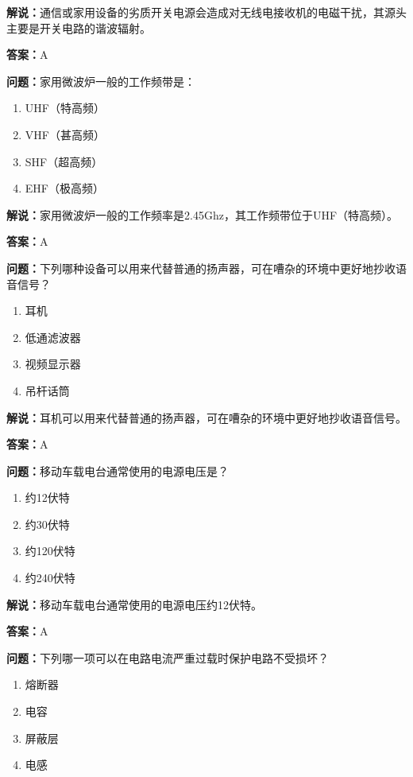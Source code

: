 \textbf{解说：}通信或家用设备的劣质开关电源会造成对无线电接收机的电磁干扰，其源头主要是开关电路的谐波辐射。%

\textbf{答案：}A

\textbf{问题：}家用微波炉一般的工作频带是：

\begin{enumerate}[label=\Alph*), leftmargin=3em]
	\item UHF（特高频）
	\item VHF（甚高频）
	\item SHF（超高频）
	\item EHF（极高频）
\end{enumerate}

\textbf{解说：}家用微波炉一般的工作频率是2.45Ghz，其工作频带位于UHF（特高频）。%

\textbf{答案：}A

\textbf{问题：}下列哪种设备可以用来代替普通的扬声器，可在嘈杂的环境中更好地抄收语音信号？

\begin{enumerate}[label=\Alph*), leftmargin=3em]
	\item 耳机
	\item 低通滤波器
	\item 视频显示器
	\item 吊杆话筒
\end{enumerate}

\textbf{解说：}耳机可以用来代替普通的扬声器，可在嘈杂的环境中更好地抄收语音信号。%

\textbf{答案：}A

\textbf{问题：}移动车载电台通常使用的电源电压是？

\begin{enumerate}[label=\Alph*), leftmargin=3em]
	\item 约12伏特
	\item 约30伏特
	\item 约120伏特
	\item 约240伏特
\end{enumerate}

\textbf{解说：}移动车载电台通常使用的电源电压约12伏特。%

\textbf{答案：}A

\textbf{问题：}下列哪一项可以在电路电流严重过载时保护电路不受损坏？

\begin{enumerate}[label=\Alph*), leftmargin=3em]
	\item 熔断器
	\item 电容
	\item 屏蔽层
	\item 电感
\end{enumerate}

